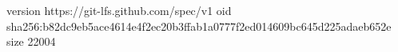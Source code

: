 version https://git-lfs.github.com/spec/v1
oid sha256:b82dc9eb5ace4614e4f2ec20b3ffab1a0777f2ed014609bc645d225adaeb652e
size 22004
